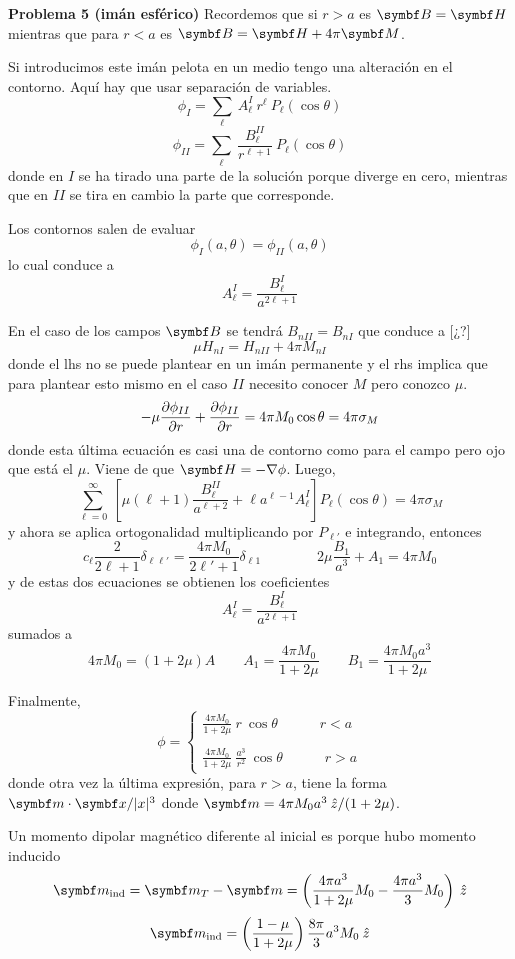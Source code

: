 \documentclass[10pt,oneside]{CBFT_book}
\begin{document}
\begin{ejemplo}{\bf Problema 5 (imán esférico)}
Recordemos que si $ r>a $ es $\vb{B}=\vb{H}$ mientras que para $r<a$ es $\vb{B} = \vb{H} + 4\pi \vb{M}$.

Si introducimos este imán pelota en un medio tengo una alteración en el contorno.
Aquí hay que usar separación de variables.
\[
	\phi_I = \sum_\ell \: A^I_\ell \: r^\ell \: P_\ell(\cos\theta)
\]
\[
	\phi_{II} = \sum_\ell \: \frac{B^{II}_\ell}{r^{\ell+1}} \: P_\ell(\cos\theta)
\]
donde en $I$ se ha tirado una parte de la solución porque diverge en cero, mientras que en $II$ se tira
en cambio la parte que corresponde.

Los contornos salen de evaluar
\[
	\phi_I(a,\theta) = \phi_{II}(a,\theta)
\]
lo cual conduce a 
\[
	A^I_\ell = \frac{B_\ell^{I}}{a^{2\ell+1}}
\]

En el caso de los campos $\vb{B}$ se tendrá $B_{nII} = B_{nI}$ que conduce a [¿?]
\[
	\mu H_{nI} = H_{nII} + 4 \pi M_{nI}
\]
donde el lhs no se puede plantear en un imán permanente y el rhs implica que para plantear
esto mismo en el caso $II$ necesito conocer $M$ pero conozco $\mu$.
\[
	- \mu \frac{\partial^{\hspace{-0.05em}} {\phi_{II}}}{\partial {r}^{\hspace{-0.05em}}} + \frac{\partial^{\hspace{-0.05em}} {\phi_{II}}}{\partial {r}^{\hspace{-0.05em}}} = 4 \pi M_0 \cos\theta = 4 \pi \sigma_M
\]
donde esta última ecuación es casi una de contorno como para el campo   pero ojo que
está el $\mu$. Viene de que $\vb{H} = - \nabla\phi$.
Luego,
\[
	\sum_{\ell=0}^\infty \: 
	\left[ \mu(\ell+1) \frac{B^{II}_\ell}{a^{\ell+2}} + \ell a^{\ell-1} A_\ell^I \right] 
	P_\ell (\cos\theta) =  4 \pi \sigma_M
\]
y ahora se aplica ortogonalidad multiplicando por $P_{\ell'}$ e integrando, entonces
\[
	c_\ell \frac{2}{2\ell +1} \delta_{\ell\ell'} = \frac{4\pi M_0}{2\ell'+1} \delta_{\ell 1}
	\qquad \qquad  2 \mu \frac{B_1}{a^3} + A_1 = 4 \pi M_0
\]
y de estas dos ecuaciones se obtienen los coeficientes
\[
	A^I_\ell = \frac{B_\ell^{I}}{a^{2\ell+1}}
\]
sumados a
\[
	4\pi M_0 = (1+2\mu) A \qquad A_1 = \frac{4 \pi M_0}{1+2\mu} \qquad B_1 = \frac{4 \pi M_0 a^3}{1+2\mu}
\]

Finalmente,
\[
	\phi = \begin{cases}
		\displaystyle \frac{4 \pi M_0}{1+2\mu}\: r \:\cos\theta \quad \qquad r < a \\
			\\
		\displaystyle \frac{4 \pi M_0}{1+2\mu}\: \frac{a^3}{r^2} \:\cos\theta \quad \qquad r > a
		\end{cases}
\]
donde otra vez la última expresión, para $ r > a $, tiene la forma $ \pe{m}{x}/|x|^3$ donde
$\vb{m} = 4 \pi M_0 a^3 \zver /(1+2\mu)$.

Un momento dipolar magnético diferente al inicial es porque hubo momento inducido
\[
	\vb{m}_{\text{ind}} = \vb{m}_T - \vb{m} =
	\left( \frac{4 \pi a^3}{1+2\mu} M_0 - \frac{4 \pi a^3}{3} M_0 \right) \zver
\]
\[
	\vb{m}_{\text{ind}} = \Frac{1-\mu}{1 + 2\mu} \frac{8\pi}{3} a^3 M_0 \zver
\]
 
\end{ejemplo}
\end{document}
